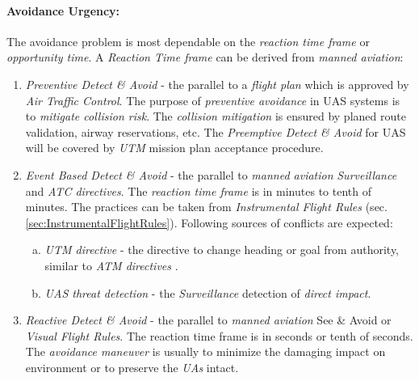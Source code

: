 \setcounter{chapter}{6}
\setcounter{section}{7}
\setcounter{subsection}{3}

\paragraph{Avoidance Urgency:} The avoidance problem is most dependable on the \emph{reaction time frame} or \emph{opportunity time}. A \emph{Reaction Time frame} can be derived from \emph{manned aviation}:

\begin{enumerate}
    \item \emph{Preventive Detect \& Avoid} - the parallel to a \emph{flight plan} which is approved by \emph{Air Traffic Control}. The purpose of \emph{preventive avoidance} in UAS systems is to \emph{mitigate collision risk}. The \emph{collision mitigation} is ensured by planed route validation, airway reservations, etc. The \emph{Preemptive Detect \& Avoid} for UAS will be covered by \emph{UTM} mission plan acceptance procedure.  
    
    \item \emph{Event Based Detect \& Avoid} - the parallel to \emph{manned aviation} \emph{Surveillance} and \emph{ATC directives}. The \emph{reaction time frame} is in minutes to tenth of minutes. The practices can be taken from \emph{Instrumental Flight Rules} (sec. \ref{sec:InstrumentalFlightRules}). Following sources of conflicts are expected:
    \begin{enumerate}[a.]
        \item \emph{UTM directive} - the directive to change heading or goal from authority, similar to \emph{ATM directives} \cite{icao4444}.
        
        \item \emph{UAS threat detection} - the \emph{Surveillance} detection of \emph{direct impact}.
    \end{enumerate}
    
    \item \emph{Reactive Detect \& Avoid} - the parallel to \emph{manned aviation} See \& Avoid or \emph{Visual Flight Rules}. The reaction time frame is in seconds or tenth of seconds. The \emph{avoidance maneuver} is usually to minimize the damaging impact on environment or to preserve the \emph{UAs} intact.
\end{enumerate}

